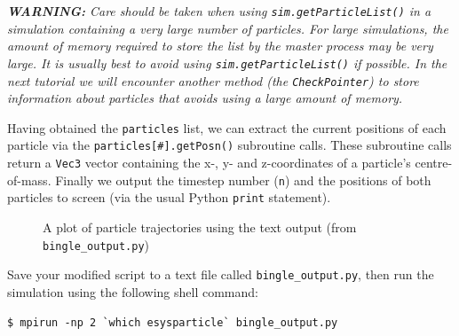 \vskip 5mm
\begin{minipage}{5.75in}
\emph{\textbf{WARNING:} Care should be taken when using \texttt{sim.getParticleList()} in a simulation containing a very large number of particles. For large simulations, the amount of memory required to store the list by the master process may be very large. It is usually best to avoid using \texttt{sim.getParticleList()} if possible. In the next tutorial we will encounter another method (the \texttt{CheckPointer}) to store information about particles that avoids using a large amount of memory. }
\end{minipage}
\vskip 5mm


Having obtained the \texttt{particles} list, we can extract the current positions of each particle via the \texttt{particles[\#].getPosn()} subroutine calls. These subroutine calls return a \texttt{Vec3} vector containing the x-, y- and z-coordinates of a particle's centre-of-mass. Finally we output the timestep number (\texttt{n}) and the positions of both particles to screen (via the usual Python \texttt{print} statement).

\begin{figure}
\caption{A plot of particle trajectories using the text output (from \texttt{bingle\_output.py})} \label{fig:bingle_output}
\end{figure}

Save your modified script to a text file called \texttt{bingle\_output.py}, then run the simulation using the following shell command:

\begin{verbatim}
$ mpirun -np 2 `which esysparticle` bingle_output.py 
\end{verbatim}

